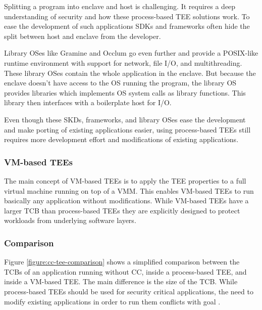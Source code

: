 
Splitting a program into enclave and host is challenging. It requires a deep
understanding of security and how these process-based TEE solutions work. To
ease the development of such applications SDKs and frameworks often hide the
split between host and enclave from the developer\cite{schuster2022}.

Library OSes like Gramine and Occlum go even further and provide a POSIX-like
runtime environment with support for network, file I/O, and multithreading.
These library OSes contain the whole application in the enclave. But because the
enclave doesn't have access to the OS running the program, the library OS
provides libraries which implements OS system calls as library functions. This
library then interfaces with a boilerplate host for I/O\cite{tsai2014}.

Even though these SKDs, frameworks, and library OSes ease the development and
make porting of existing applications easier, using process-based TEEs still
requires more development effort and modifications of existing applications.


\subsubsection{VM-based TEEs}

The main concept of VM-based TEEs is to apply the TEE properties to a full
virtual machine running on top of a VMM. This enables VM-based TEEs to run
basically any application without modifications. While VM-based TEEs have a
larger TCB than process-based TEEs they are explicitly designed to protect
workloads from underlying software layers.


\subsubsection{Comparison}

Figure \ref{figure:cc-tee-comparison} shows a simplified comparison between the
TCBs of an application running without CC, inside a process-based TEE, and
inside a VM-based TEE. The main difference is the size of the TCB. While
process-based TEEs should be used for security critical applications, the
need to modify existing applications in order to run them conflicts with goal
.

